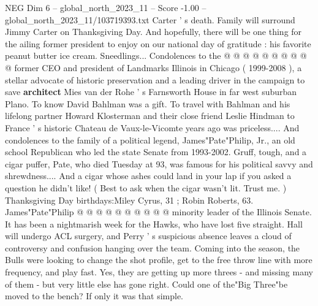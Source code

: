 \begin{textsample}{NEG Dim 6 – global\_north\_2023\_11 – Score -1.00 – global\_north\_2023\_11/103719393.txt}
Carter ' s death.
Family will surround Jimmy Carter on Thanksgiving Day.
And hopefully, there will be one thing for the ailing former president to enjoy on our national day of gratitude : his favorite peanut butter ice cream.
Sneedlings...
Condolences to the @ @ @ @ @ @ @ @ @ @ former CEO and president of Landmarks Illinois in Chicago ( 1999-2008 ), a stellar advocate of historic preservation and a leading driver in the campaign to save \textbf{architect} Mies van der Rohe ' s Farnsworth House in far west suburban Plano.
To know David Bahlman was a gift.
To travel with Bahlman and his lifelong partner Howard Klosterman and their close friend Leslie Hindman to France ' s historic Chateau de Vaux-le-Vicomte years ago was priceless....
And condolences to the family of a political legend, James"Pate"Philip, Jr., an old school Republican who led the state Senate from 1993-2002.
Gruff, tough, and a cigar puffer, Pate, who died Tuesday at 93, was famous for his political savvy and shrewdness....
And a cigar whose ashes could land in your lap if you asked a question he didn't like! ( Best to ask when the cigar wasn't lit.
Trust me. ) Thanksgiving Day birthdays:Miley Cyrus, 31 ; Robin Roberts, 63.
James"Pate"Philip @ @ @ @ @ @ @ @ @ @ minority leader of the Illinois Senate.
It has been a nightmarish week for the Hawks, who have lost five straight.
Hall will undergo ACL surgery, and Perry ' s suspicious absence leaves a cloud of controversy and confusion hanging over the team.
Coming into the season, the Bulls were looking to change the shot profile, get to the free throw line with more frequency, and play fast.
Yes, they are getting up more threes - and missing many of them - but very little else has gone right.
Could one of the"Big Three"be moved to the bench?
If only it was that simple.

\end{textsample}
